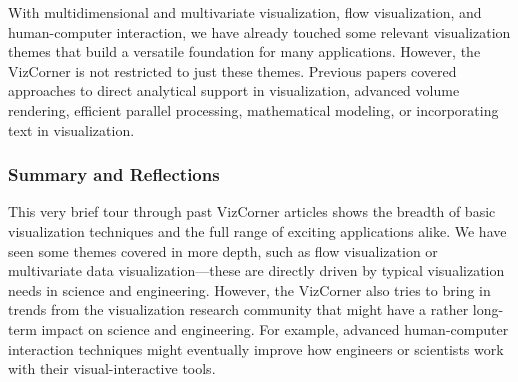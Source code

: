 \documentclass[10pt,journal,compsoc]{IEEEtran}
\begin{document}
{With multidimensional and multivariate visualization, flow visualization, and human-computer interaction, we have already touched some relevant visualization themes that build a versatile foundation for many applications. However, the VizCorner is not restricted to just these themes. Previous papers covered approaches to direct analytical support in visualization, advanced volume rendering, efficient parallel processing, mathematical modeling, or incorporating text in visualization.  %





\subsubsection{Summary and Reflections}

This very brief tour through past VizCorner articles shows the breadth of basic visualization techniques and the full range of exciting applications alike. We have seen some themes covered in more depth, such as flow visualization or multivariate data visualization---these are directly driven by typical visualization needs in science and engineering. However, the VizCorner also tries to bring in trends from the visualization research community that might have a rather long-term impact on science and engineering. For example, advanced human-computer interaction techniques might eventually improve how engineers or scientists work with their visual-interactive tools. 

}
\end{document}
